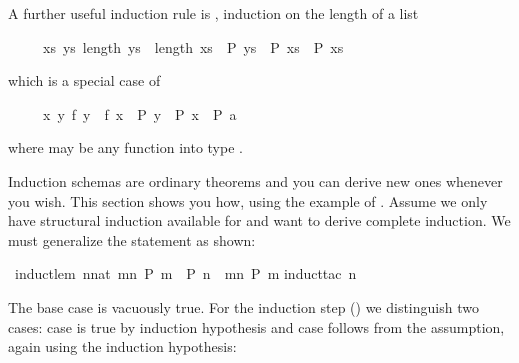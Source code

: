 \begin{isabellebody}
\begin{isamarkuptext}
A further useful induction rule is ,
induction on the length of a list
\begin{isabelle}%
\ \ \ \ \ {\isacharparenleft}{\isasymAnd}xs{\isachardot}\ {\isasymforall}ys{\isachardot}\ length\ ys\ {\isacharless}\ length\ xs\ {\isasymlongrightarrow}\ P\ ys\ {\isasymLongrightarrow}\ P\ xs{\isacharparenright}\ {\isasymLongrightarrow}\ P\ xs%
\end{isabelle}
which is a special case of 
\begin{isabelle}%
\ \ \ \ \ {\isacharparenleft}{\isasymAnd}x{\isachardot}\ {\isasymforall}y{\isachardot}\ f\ y\ {\isacharless}\ f\ x\ {\isasymlongrightarrow}\ P\ y\ {\isasymLongrightarrow}\ P\ x{\isacharparenright}\ {\isasymLongrightarrow}\ P\ a%
\end{isabelle}
where  may be any function into type .%
\end{isamarkuptext}%
\isamarkuptrue%
%
\isamarkuptrue%
%
\begin{isamarkuptext}%
\label{sec:derive-ind}
%
Induction schemas are ordinary theorems and you can derive new ones
whenever you wish.  This section shows you how, using the example
of . Assume we only have structural induction
available for  and want to derive complete induction.  We
must generalize the statement as shown:%
\end{isamarkuptext}%
\isamarkuptrue%
\ induct{\isacharunderscore}lem{\isacharcolon}\ {\isachardoublequote}{\isacharparenleft}{\isasymAnd}n{\isacharcolon}{\isacharcolon}nat{\isachardot}\ {\isasymforall}m{\isacharless}n{\isachardot}\ P\ m\ {\isasymLongrightarrow}\ P\ n{\isacharparenright}\ {\isasymLongrightarrow}\ {\isasymforall}m{\isacharless}n{\isachardot}\ P\ m{\isachardoublequote}\isanewline
\isamarkupfalse%
induct{\isacharunderscore}tac\ n{\isacharparenright}\isamarkupfalse%
%
\begin{isamarkuptxt}%
\noindent
The base case is vacuously true. For the induction step () we distinguish two cases: case  is true by induction
hypothesis and case  follows from the assumption, again using
the induction hypothesis:%
\end{isamarkuptxt}%
\ \isamarkuptrue%

\end{isabellebody}
